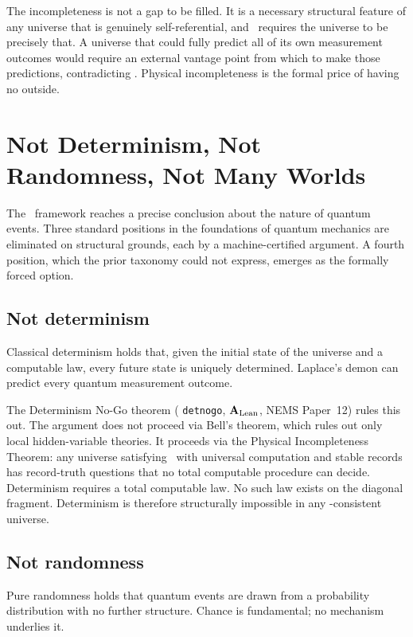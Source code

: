\documentclass[11pt,openany]{book}
\theoremstyle{remark}
\newcommand{\GTE}{\text{GTE}}
\newcommand{\PSC}{\text{PSC}}
\newcommand{\lean}[1]{%
  \penalty-100
  \begingroup\def\_{\textunderscore\allowbreak}\texttt{#1}\endgroup}
\newcommand{\CatAL}{\ensuremath{\textbf{A}_{\rm Lean}}}
\begin{document}
The incompleteness is not a gap to be filled. It is a necessary structural feature
of any universe that is genuinely self-referential, and \PSC\ requires the universe
to be precisely that. A universe that could fully predict all of its own measurement
outcomes would require an external vantage point from which to make those predictions,
contradicting \PSC. Physical incompleteness is the formal price of having no outside.

\section{Not Determinism, Not Randomness, Not Many Worlds}
\label{sec:not_det_rand_mwi}

The \GTE\ framework reaches a precise conclusion about the nature of quantum events.
Three standard positions in the foundations of quantum mechanics are eliminated on
structural grounds, each by a machine-certified argument. A fourth position, which
the prior taxonomy could not express, emerges as the formally forced option.

\subsection*{Not determinism}

Classical determinism holds that, given the initial state of the universe and a
computable law, every future state is uniquely determined. Laplace's demon can predict
every quantum measurement outcome.

The Determinism No-Go theorem (\lean{det\_no\_go}, \CatAL, NEMS Paper~12) rules this
out. The argument does not proceed via Bell's theorem, which rules out only local
hidden-variable theories. It proceeds via the Physical Incompleteness Theorem: any
universe satisfying \PSC\ with universal computation and stable records has record-truth
questions that no total computable procedure can decide. Determinism requires a total
computable law. No such law exists on the diagonal fragment. Determinism is therefore
structurally impossible in any \PSC-consistent universe.

\subsection*{Not randomness}

Pure randomness holds that quantum events are drawn from a probability distribution
with no further structure. Chance is fundamental; no mechanism underlies it.
\end{document}
